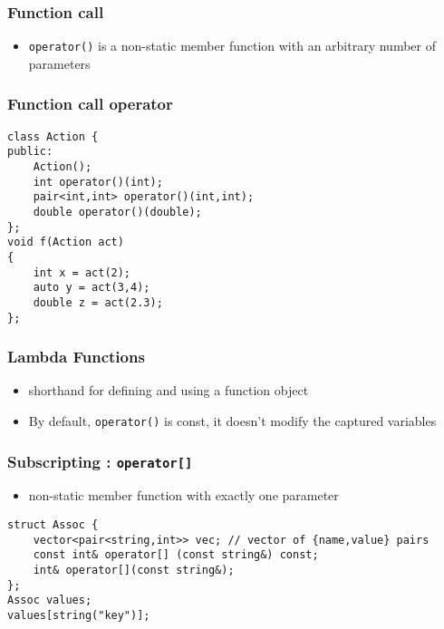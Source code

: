\documentclass{beamer}
\begin{document}
\begin{frame}[fragile]
\frametitle{Function call}
\begin{itemize}
\item \texttt{operator()} is a non-static member function with an arbitrary number of parameters
\end{itemize}
\end{frame}

\begin{frame}[fragile]
\frametitle{Function call operator}
\begin{example}
\begin{lstlisting}
class Action {
public:
    Action();
    int operator()(int);
    pair<int,int> operator()(int,int);
    double operator()(double);
};
void f(Action act)
{
    int x = act(2);
    auto y = act(3,4);
    double z = act(2.3);
};
\end{lstlisting}
\end{example}
\end{frame}


\begin{frame}[fragile]
\frametitle{Lambda Functions}
\begin{itemize}

\item shorthand for defining and using a function object
\item By default, \texttt{operator()} is const, it doesn't modify the captured variables

\end{itemize}

\end{frame}


\begin{frame}[fragile]
\frametitle{Subscripting : \texttt{operator[]} }
\begin{itemize}

\item non-static member function with exactly one parameter
\end{itemize}
\begin{example}
\begin{lstlisting}
struct Assoc {
    vector<pair<string,int>> vec; // vector of {name,value} pairs
    const int& operator[] (const string&) const;
    int& operator[](const string&);
};
Assoc values;
values[string("key")];
\end{lstlisting}
\end{example}
\end{frame}
\end{document}

